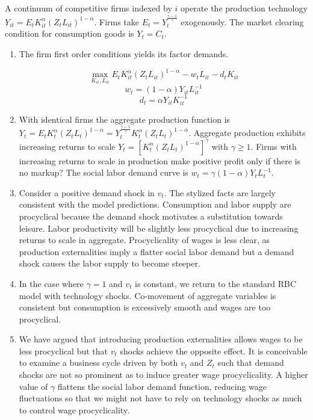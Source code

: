 \documentclass[11pt]{article}
\begin{document}
    A continuum of competitive firms indexed by $i$ operate the production technology $Y_{it} = E_t K_{it}^\alpha (Z_t L_{it})^{1-\alpha}$. Firms take $E_t = Y_t^\frac{\gamma - 1}{\gamma}$ exogenously. The market clearing condition for consumption goods is $Y_t = C_t$.

    \begin{enumerate}

        \item The firm first order conditions yields its factor demands.

            $$ \max_{K_{it}, L_{it}} E_t K_{it}^\alpha (Z_t L_{it})^{1-\alpha} - w_t L_{it} - d_t K_{it} $$
            $$ w_t = (1-\alpha) Y_{it} L_{it}^{-1} $$
            $$ d_t = \alpha Y_{it} K_{it}^{-1} $$

        \item With identical firms the aggregate production function is $Y_t = E_t K_t^\alpha (Z_t L_t)^{1-\alpha} = Y_t^\frac{\gamma - 1}{\gamma} K_t^\alpha (Z_t L_t)^{1-\alpha}$. Aggregate production exhibits increasing returns to scale $Y_t = [K_t^\alpha (Z_t L_t)^{1-\alpha}]^\gamma$ with $\gamma \geq 1$. Firms with increasing returns to scale in production make positive profit only if there is no markup? The social labor demand curve is $w_t = \gamma (1-\alpha) Y_t L_t^{-1}$.

        \item Consider a positive demand shock in $v_t$. The stylized facts are largely consistent with the model predictions. Consumption and labor supply are procyclical because the demand shock motivates a substitution towards leisure. Labor productivity will be slightly less procyclical due to increasing returns to scale in aggregate. Procyclicality of wages is less clear, as production externalities imply a flatter social labor demand but a demand shock causes the labor supply to become steeper.

        \item In the case where $\gamma = 1$ and $v_t$ is constant, we return to the standard RBC model with technology shocks. Co-movement of aggregate variables is consistent but consumption is excessively smooth and wages are too procyclical.

        \item We have argued that introducing production externalities allows wages to be less procyclical but that $v_t$ shocks achieve the opposite effect. It is conceivable to examine a business cycle driven by both $v_t$ and $Z_t$ such that demand shocks are not so prominent as to induce greater wage procyclicality. A higher value of $\gamma$ flattens the social labor demand function, reducing wage fluctuations so that we might not have to rely on technology shocks as much to control wage procyclicality.

    \end{enumerate}
\end{document}

